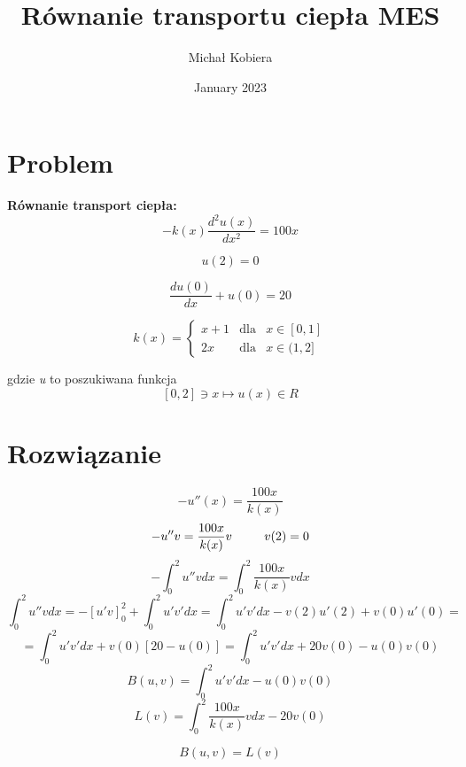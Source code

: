 \documentclass{article}
\title{Równanie transportu ciepła MES}
\author{Michał Kobiera}
\date{January 2023}
\begin{document}
\maketitle
\newpage

\section{Problem}
\textbf{Równanie transport ciepła:}
\[-k(x)\frac{d^2u(x)}{dx^2} = 100x\]

\[u(2) = 0\]

\[\frac{du(0)}{dx} + u(0) = 20\]

\[k(x) = \left\{ \begin{array}{rcl}
x + 1 & \mbox{dla}
& x \in [0, 1] \\ 2x & \mbox{dla} & x \in (1, 2]
\end{array}\right.\]

gdzie \textit{u} to poszukiwana funkcja
\[[0,2] \ni x \mapsto u(x) \in R\]

\section{Rozwiązanie}

\[-u''(x) = \frac{100x}{k(x)}\]
\[-u''v = \frac{100x}{k(x)}v\ \hspace{8mm} v(2) = 0\]
\[-\int_0^2 u''vdx = \int_0^2 \frac{100x}{k(x)}vdx\]
\newline
\[\int_0^2 u''vdx = -[u'v]_0^2 + \int_0^2 u'v'dx = \int_0^2 u'v'dx - v(2)u'(2) + v(0)u'(0) = \]
\[= \int_0^2 u'v'dx + v(0)[20-u(0)] = \int_0^2 u'v'dx + 20v(0) - u(0)v(0)\]
\newline
\[B(u, v) = \int_0^2 u'v'dx - u(0)v(0)\]
\[L(v) = \int_0^2 \frac{100x}{k(x)}vdx - 20v(0)\]

\newline
\[B(u, v) = L(v)\]
\end{document}
